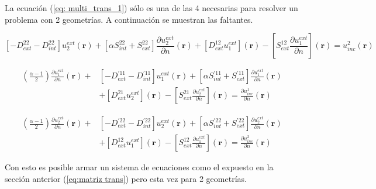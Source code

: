 \documentclass[12pt,letterpaper]{article}
\numberwithin{equation}{section}
\begin{document}
La ecuación (\ref{eq: multi_trans_1}) sólo es una de las 4 necesarias para resolver un problema con 2 geometrías. A continuación se muestran las faltantes.

\begin{equation}
\left[-D_{ext}^{22} - D_{int}^{22}\right] u^{ext}_2(\textbf{r}) + \left[\alpha S_{int}^{22} + S_{ext}^{22}\right]\frac{\partial u^{ext}_2}{\partial n}(\textbf{r}) + \left[D_{ext}^{12} u^{ext}_1\right](\textbf{r}) - \left[S_{ext}^{12} \frac{\partial u^{ext}_1}{\partial n}\right](\textbf{r}) = u_{inc}^2(\textbf{r}) 
\label{eq: multi_trans_2}		
\end{equation}

\begin{equation}
\begin{split}
(\frac{\alpha - 1}{2})\frac{\partial u^{ext}_1}{\partial n}(\textbf{r}) + &\left[-D_{ext}^{'11} - D_{int}^{'11}\right] u^{ext}_1(\textbf{r}) + \left[\alpha S_{int}^{'11} + S_{ext}^{'11}\right]\frac{\partial u^{ext}_1}{\partial n}(\textbf{r})\\
&+ \left[D_{ext}^{21} u^{ext}_2\right](\textbf{r}) - \left[S_{ext}^{21} \frac{\partial u^{ext}_2}{\partial n}\right](\textbf{r}) = \frac{\partial u_{inc}^1}{\partial n}(\textbf{r}) 
\end{split}
\label{eq: multi_trans_deriv_1}		
\end{equation}

\begin{equation}
\begin{split}
(\frac{\alpha - 1}{2})\frac{\partial u^{ext}_2}{\partial n}(\textbf{r}) + &\left[-D_{ext}^{'22} - D_{int}^{'22}\right] u^{ext}_2(\textbf{r}) + \left[\alpha S_{int}^{'22} + S_{ext}^{'22}\right]\frac{\partial u^{ext}_2}{\partial n}(\textbf{r})\\
&+ \left[D_{ext}^{12} u^{ext}_1\right](\textbf{r}) - \left[S_{ext}^{12} \frac{\partial u^{ext}_1}{\partial n}\right](\textbf{r}) = \frac{\partial u_{inc}^2}{\partial n}(\textbf{r}) 
\end{split}
\label{eq: multi_trans_deriv_2}		
\end{equation}

Con esto es posible armar un sistema de ecuaciones como el expuesto en la sección anterior (\ref{eq:matriz trans}) pero esta vez para 2 geometrías.
\end{document}
